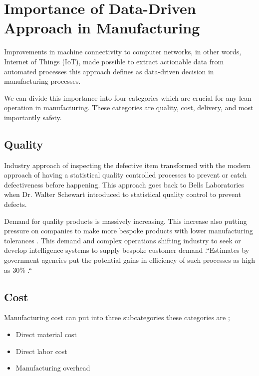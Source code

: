 \documentclass[sigconf]{acmart}
\begin{document}

\section{Importance of Data-Driven Approach in Manufacturing}

Improvements in machine connectivity to computer networks, in other words, Internet of Things (IoT), made possible to extract actionable data from automated processes this approach defines as data-driven decision in manufacturing processes\cite{data-driven, HE2017}.

\par We can divide this importance into four categories which are crucial for any lean operation in manufacturing\cite{www-leanblog}. These categories are quality, cost, delivery, and most importantly safety\cite{www-leanblog}.


\subsection{Quality}

Industry approach of inspecting the defective item transformed with the modern approach of having a statistical quality controlled processes to prevent or catch defectiveness before happening. This approach goes back to Bells Laboratories when Dr. Walter Schewart introduced to statistical quality control to prevent defects\cite{yusof1998}.

\par Demand for quality products is massively increasing. This increase also putting pressure on companies to make more bespoke products with lower manufacturing tolerances \cite{OLIFF2017167}. This demand and complex operations shifting industry to seek or develop intelligence systems to supply bespoke customer demand \cite{OLIFF2017167}.``Estimates by government agencies put the potential gains in efficiency of such processes as high as 30\% \cite{OLIFF2017167}.`` 

\subsection{Cost}
Manufacturing cost can put into three subcategories these categories are \cite{www-wikipedia};

\begin{itemize}
    \item Direct material cost
    \item Direct labor cost
    \item Manufacturing overhead
\end{itemize}
\end{document}
